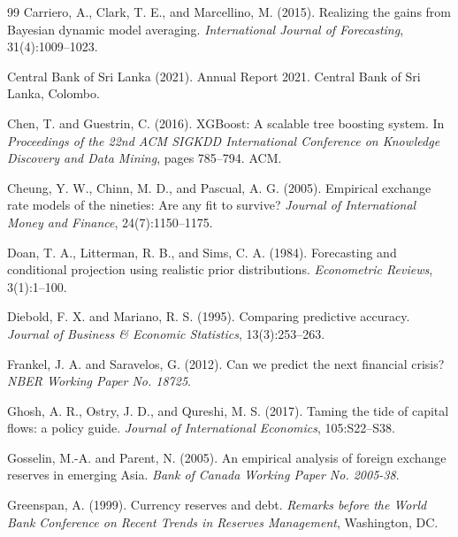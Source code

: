 \documentclass[12pt,a4paper]{article}
\begin{document}
\begin{thebibliography}{99}
Carriero, A., Clark, T. E., and Marcellino, M. (2015).
\newblock Realizing the gains from Bayesian dynamic model averaging.
\newblock \textit{International Journal of Forecasting}, 31(4):1009--1023.

Central Bank of Sri Lanka (2021).
\newblock Annual Report 2021.
\newblock Central Bank of Sri Lanka, Colombo.

Chen, T. and Guestrin, C. (2016).
\newblock XGBoost: A scalable tree boosting system.
\newblock In \textit{Proceedings of the 22nd ACM SIGKDD International Conference on Knowledge Discovery and Data Mining}, pages 785--794. ACM.

Cheung, Y. W., Chinn, M. D., and Pascual, A. G. (2005).
\newblock Empirical exchange rate models of the nineties: Are any fit to survive?
\newblock \textit{Journal of International Money and Finance}, 24(7):1150--1175.

Doan, T. A., Litterman, R. B., and Sims, C. A. (1984).
\newblock Forecasting and conditional projection using realistic prior distributions.
\newblock \textit{Econometric Reviews}, 3(1):1--100.

Diebold, F. X. and Mariano, R. S. (1995).
\newblock Comparing predictive accuracy.
\newblock \textit{Journal of Business \& Economic Statistics}, 13(3):253--263.

Frankel, J. A. and Saravelos, G. (2012).
\newblock Can we predict the next financial crisis?
\newblock \textit{NBER Working Paper No. 18725}.

Ghosh, A. R., Ostry, J. D., and Qureshi, M. S. (2017).
\newblock Taming the tide of capital flows: a policy guide.
\newblock \textit{Journal of International Economics}, 105:S22--S38.

Gosselin, M.-A. and Parent, N. (2005).
\newblock An empirical analysis of foreign exchange reserves in emerging Asia.
\newblock \textit{Bank of Canada Working Paper No. 2005-38}.

Greenspan, A. (1999).
\newblock Currency reserves and debt.
\newblock \textit{Remarks before the World Bank Conference on Recent Trends in Reserves Management}, Washington, DC.


\end{thebibliography}
\end{document}
